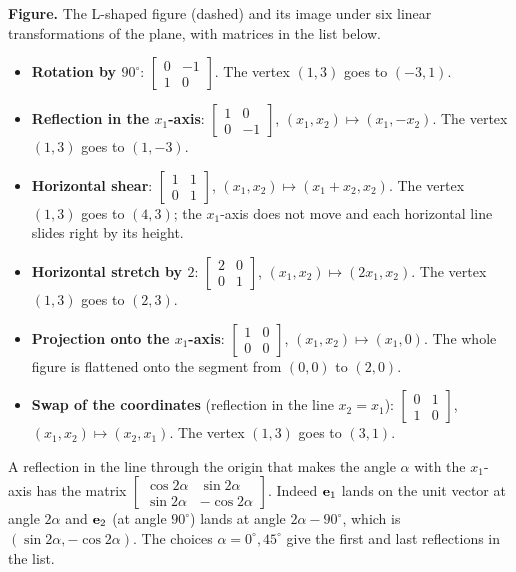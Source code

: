 \documentclass[11pt]{article}
\begin{document}
\textbf{Figure.} The L-shaped figure (dashed) and its image under six linear transformations of the plane, with matrices in the list below.

\begin{itemize}
  \item \textbf{Rotation by $90^\circ$}: $\begin{bmatrix}0&-1\\1&0\end{bmatrix}$. The vertex $(1,3)$ goes to $(-3,1)$.
  \item \textbf{Reflection in the $x_1$-axis}: $\begin{bmatrix}1&0\\0&-1\end{bmatrix}$, $(x_1,x_2)\mapsto(x_1,-x_2)$. The vertex $(1,3)$ goes to $(1,-3)$.
  \item \textbf{Horizontal shear}: $\begin{bmatrix}1&1\\0&1\end{bmatrix}$, $(x_1,x_2)\mapsto(x_1+x_2,x_2)$. The vertex $(1,3)$ goes to $(4,3)$; the $x_1$-axis does not move and each horizontal line slides right by its height.
  \item \textbf{Horizontal stretch by $2$}: $\begin{bmatrix}2&0\\0&1\end{bmatrix}$, $(x_1,x_2)\mapsto(2x_1,x_2)$. The vertex $(1,3)$ goes to $(2,3)$.
  \item \textbf{Projection onto the $x_1$-axis}: $\begin{bmatrix}1&0\\0&0\end{bmatrix}$, $(x_1,x_2)\mapsto(x_1,0)$. The whole figure is flattened onto the segment from $(0,0)$ to $(2,0)$.
  \item \textbf{Swap of the coordinates} (reflection in the line $x_2=x_1$): $\begin{bmatrix}0&1\\1&0\end{bmatrix}$, $(x_1,x_2)\mapsto(x_2,x_1)$. The vertex $(1,3)$ goes to $(3,1)$.
\end{itemize}

\begin{remark}
A reflection in the line through the origin that makes the angle $\alpha$ with the $x_1$-axis has the matrix $\begin{bmatrix}\cos2\alpha&\sin2\alpha\\\sin2\alpha&-\cos2\alpha\end{bmatrix}$. Indeed $\mathbf{e}_1$ lands on the unit vector at angle $2\alpha$ and $\mathbf{e}_2$ (at angle $90^\circ$) lands at angle $2\alpha-90^\circ$, which is $(\sin2\alpha,-\cos2\alpha)$. The choices $\alpha=0^\circ,45^\circ$ give the first and last reflections in the list.
\end{remark}
\end{document}
